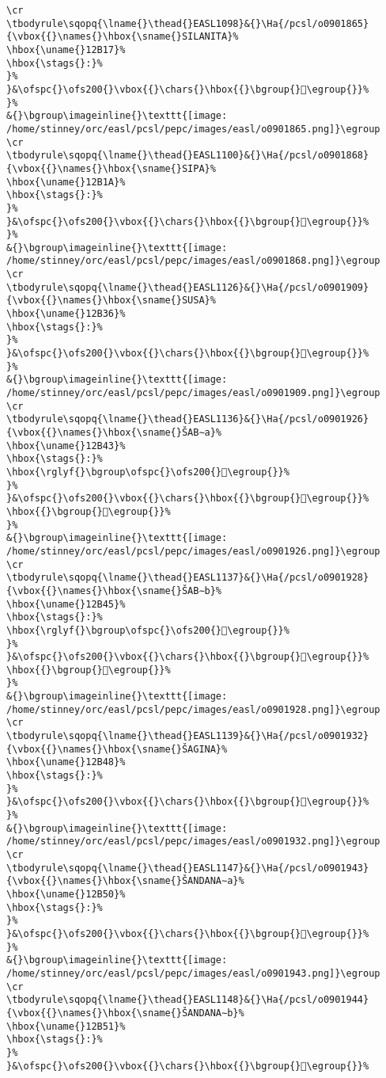 \begin{verbatim}
\cr
\tbodyrule\sqopq{\lname{}\thead{}EASL1098}&{}\Ha{/pcsl/o0901865}{\vbox{{}\names{}\hbox{\sname{}SILANITA}%
\hbox{\uname{}12B17}%
\hbox{\stags{}:}%
}%
}&\ofspc{}\ofs200{}\vbox{{}\chars{}\hbox{{}\bgroup{}𒬗\egroup{}}%
}%
&{}\bgroup\imageinline{}\texttt{[image: /home/stinney/orc/easl/pcsl/pepc/images/easl/o0901865.png]}\egroup
\cr
\tbodyrule\sqopq{\lname{}\thead{}EASL1100}&{}\Ha{/pcsl/o0901868}{\vbox{{}\names{}\hbox{\sname{}SIPA}%
\hbox{\uname{}12B1A}%
\hbox{\stags{}:}%
}%
}&\ofspc{}\ofs200{}\vbox{{}\chars{}\hbox{{}\bgroup{}𒬚\egroup{}}%
}%
&{}\bgroup\imageinline{}\texttt{[image: /home/stinney/orc/easl/pcsl/pepc/images/easl/o0901868.png]}\egroup
\cr
\tbodyrule\sqopq{\lname{}\thead{}EASL1126}&{}\Ha{/pcsl/o0901909}{\vbox{{}\names{}\hbox{\sname{}SUSA}%
\hbox{\uname{}12B36}%
\hbox{\stags{}:}%
}%
}&\ofspc{}\ofs200{}\vbox{{}\chars{}\hbox{{}\bgroup{}𒬶\egroup{}}%
}%
&{}\bgroup\imageinline{}\texttt{[image: /home/stinney/orc/easl/pcsl/pepc/images/easl/o0901909.png]}\egroup
\cr
\tbodyrule\sqopq{\lname{}\thead{}EASL1136}&{}\Ha{/pcsl/o0901926}{\vbox{{}\names{}\hbox{\sname{}ŠAB∼a}%
\hbox{\uname{}12B43}%
\hbox{\stags{}:}%
\hbox{\rglyf{}\bgroup\ofspc{}\ofs200{}𒭃\egroup{}}%
}%
}&\ofspc{}\ofs200{}\vbox{{}\chars{}\hbox{{}\bgroup{}𒭂\egroup{}}%
\hbox{{}\bgroup{}𒭃\egroup{}}%
}%
&{}\bgroup\imageinline{}\texttt{[image: /home/stinney/orc/easl/pcsl/pepc/images/easl/o0901926.png]}\egroup
\cr
\tbodyrule\sqopq{\lname{}\thead{}EASL1137}&{}\Ha{/pcsl/o0901928}{\vbox{{}\names{}\hbox{\sname{}ŠAB∼b}%
\hbox{\uname{}12B45}%
\hbox{\stags{}:}%
\hbox{\rglyf{}\bgroup\ofspc{}\ofs200{}𒭅\egroup{}}%
}%
}&\ofspc{}\ofs200{}\vbox{{}\chars{}\hbox{{}\bgroup{}𒭄\egroup{}}%
\hbox{{}\bgroup{}𒭅\egroup{}}%
}%
&{}\bgroup\imageinline{}\texttt{[image: /home/stinney/orc/easl/pcsl/pepc/images/easl/o0901928.png]}\egroup
\cr
\tbodyrule\sqopq{\lname{}\thead{}EASL1139}&{}\Ha{/pcsl/o0901932}{\vbox{{}\names{}\hbox{\sname{}ŠAGINA}%
\hbox{\uname{}12B48}%
\hbox{\stags{}:}%
}%
}&\ofspc{}\ofs200{}\vbox{{}\chars{}\hbox{{}\bgroup{}𒭈\egroup{}}%
}%
&{}\bgroup\imageinline{}\texttt{[image: /home/stinney/orc/easl/pcsl/pepc/images/easl/o0901932.png]}\egroup
\cr
\tbodyrule\sqopq{\lname{}\thead{}EASL1147}&{}\Ha{/pcsl/o0901943}{\vbox{{}\names{}\hbox{\sname{}ŠANDANA∼a}%
\hbox{\uname{}12B50}%
\hbox{\stags{}:}%
}%
}&\ofspc{}\ofs200{}\vbox{{}\chars{}\hbox{{}\bgroup{}𒭐\egroup{}}%
}%
&{}\bgroup\imageinline{}\texttt{[image: /home/stinney/orc/easl/pcsl/pepc/images/easl/o0901943.png]}\egroup
\cr
\tbodyrule\sqopq{\lname{}\thead{}EASL1148}&{}\Ha{/pcsl/o0901944}{\vbox{{}\names{}\hbox{\sname{}ŠANDANA∼b}%
\hbox{\uname{}12B51}%
\hbox{\stags{}:}%
}%
}&\ofspc{}\ofs200{}\vbox{{}\chars{}\hbox{{}\bgroup{}𒭑\egroup{}}%

\end{verbatim}

